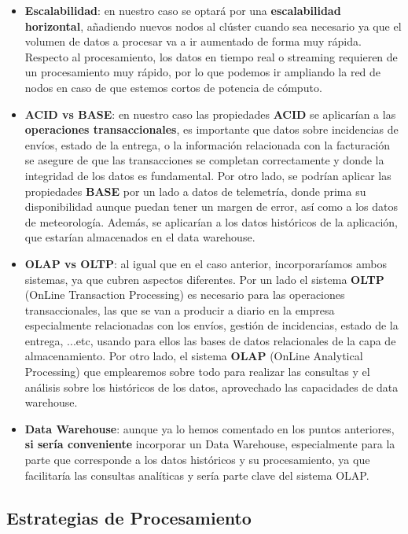 \begin{itemize}
	\item \textbf{Escalabilidad}: en nuestro caso se optará por una \textbf{escalabilidad horizontal}, añadiendo nuevos nodos al clúster cuando sea necesario ya que el volumen de datos a procesar va a ir aumentado de forma muy rápida. Respecto al procesamiento, los datos en tiempo real o streaming requieren de un procesamiento muy rápido, por lo que podemos ir ampliando la red de nodos en caso de que estemos cortos de potencia de cómputo.
	
	\item \textbf{ACID vs BASE}: en nuestro caso las propiedades \textbf{ACID} se aplicarían a las \textbf{operaciones transaccionales}, es importante que datos sobre incidencias de envíos, estado de la entrega, o la información relacionada con la facturación se asegure de que las transacciones se completan correctamente y donde la integridad de los datos es fundamental. Por otro lado, se podrían aplicar las propiedades \textbf{BASE} por un lado a datos de telemetría, donde prima su disponibilidad aunque puedan tener un margen de error, así como a los datos de meteorología. Además, se aplicarían a los datos históricos de la aplicación, que estarían almacenados en el data warehouse. 
	
	\item \textbf{OLAP vs OLTP}: al igual que en el caso anterior, incorporaríamos ambos sistemas, ya que cubren aspectos diferentes. Por un lado el sistema \textbf{OLTP} (OnLine Transaction Processing) es necesario para las operaciones transaccionales, las que se van a producir a diario en la empresa especialmente relacionadas con los envíos, gestión de incidencias, estado de la entrega, ...etc, usando para ellos las bases de datos relacionales de la capa de almacenamiento. Por otro lado, el sistema \textbf{OLAP} (OnLine Analytical Processing) que emplearemos sobre todo para realizar las consultas y el análisis sobre los históricos de los datos, aprovechado las capacidades de data warehouse.
	
	\item \textbf{Data Warehouse}: aunque ya lo hemos comentado en los puntos anteriores, \textbf{si sería conveniente} incorporar un Data Warehouse, especialmente para la parte que corresponde a los datos históricos y su procesamiento, ya que facilitaría las consultas analíticas y sería parte clave del sistema OLAP.
\end{itemize} 


\subsection{Estrategias de Procesamiento}

